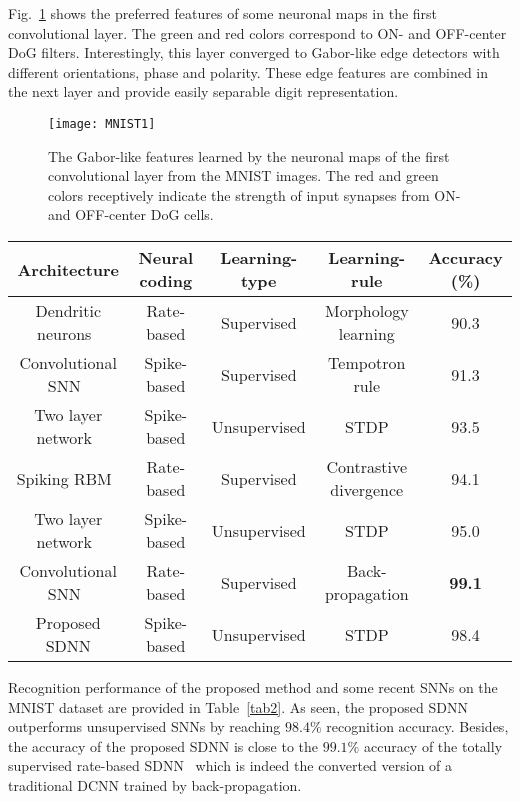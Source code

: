 \documentclass[preprint,5p,12pt,twocolumn]{article}
\begin{document}
Fig.~\ref{figure5} shows the preferred features of some neuronal maps in the first  convolutional layer. The green and red colors correspond to ON- and OFF-center DoG filters. Interestingly, this layer converged to Gabor-like edge detectors with different orientations, phase and polarity. These edge features are combined in the next layer and provide easily separable digit representation.

\begin{figure}[!tb]
\centering
\texttt{[image: MNIST1]}
\caption{The Gabor-like features learned by the neuronal maps of the first convolutional layer from the MNIST images. The red and green colors receptively indicate the  strength of input synapses from ON- and OFF-center DoG cells.}
\label{figure5}
\end{figure}




 \begin{table*}[!ht]
 \centering
\caption{Recognition accuracies of the proposed SDNN and some other SNNs over the MNIST dataset.}
\label{tab2}{\begin{tabular}{|c|c|c|c|c|}
\hline
Architecture &Neural coding& Learning-type & Learning-rule & Accuracy (\%)\\ \hline
Dendritic neurons~\cite{hussain2014improved} & Rate-based& Supervised & Morphology learning & 90.3\\
\hline
Convolutional SNN~\cite{zhao2015feedforward} & Spike-based & Supervised & Tempotron rule & 91.3\\
\hline
Two layer network~\cite{querlioz2013immunity} & Spike-based &Unsupervised &  STDP & 93.5\\
\hline
Spiking RBM~\cite{o2015real}& Rate-based & Supervised & Contrastive divergence & 94.1\\
\hline
Two layer network~\cite{diehl2015unsupervised} & Spike-based & Unsupervised &  STDP &
95.0\\
\hline
Convolutional SNN~\cite{diehl2015fast} & Rate-based & Supervised & Back-propagation & \textbf{99.1}\\
\hline
Proposed SDNN & Spike-based & Unsupervised & STDP & 98.4\\
\hline
\end{tabular}}
\end{table*}

  Recognition performance of the proposed method and some recent SNNs on the MNIST dataset are provided in Table~\ref{tab2}. As seen, the proposed SDNN outperforms unsupervised SNNs by reaching $98.4\%$ recognition accuracy. Besides, the accuracy of the proposed SDNN is close to the $99.1\%$ accuracy of the totally supervised rate-based SDNN~\cite{diehl2015fast} which is indeed the converted version of a traditional DCNN trained by back-propagation.
\end{document}
